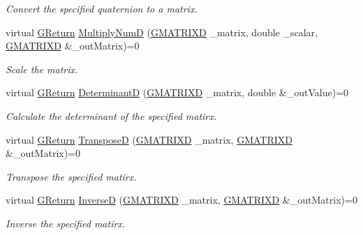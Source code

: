 \begin{DoxyCompactItemize}
\begin{DoxyCompactList}\small\item\em Convert the specified quaternion to a matrix. \end{DoxyCompactList}\item 
virtual \mbox{\hyperlink{namespace_g_w_a67a839e3df7ea8a5c5686613a7a3de21}{G\+Return}} \mbox{\hyperlink{class_g_w_1_1_m_a_t_h_1_1_g_matrix_a34e78f82e720eba937824cdc06490b9c}{Multiply\+NumD}} (\mbox{\hyperlink{struct_g_w_1_1_m_a_t_h_1_1_g_m_a_t_r_i_x_d}{G\+M\+A\+T\+R\+I\+XD}} \+\_\+matrix, double \+\_\+scalar, \mbox{\hyperlink{struct_g_w_1_1_m_a_t_h_1_1_g_m_a_t_r_i_x_d}{G\+M\+A\+T\+R\+I\+XD}} \&\+\_\+out\+Matrix)=0
\begin{DoxyCompactList}\small\item\em Scale the matrix. \end{DoxyCompactList}\item 
virtual \mbox{\hyperlink{namespace_g_w_a67a839e3df7ea8a5c5686613a7a3de21}{G\+Return}} \mbox{\hyperlink{class_g_w_1_1_m_a_t_h_1_1_g_matrix_ab1b528820ac0476f8f3d9202a3036b8c}{DeterminantD}} (\mbox{\hyperlink{struct_g_w_1_1_m_a_t_h_1_1_g_m_a_t_r_i_x_d}{G\+M\+A\+T\+R\+I\+XD}} \+\_\+matrix, double \&\+\_\+out\+Value)=0
\begin{DoxyCompactList}\small\item\em Calculate the determinant of the specified matirx. \end{DoxyCompactList}\item 
virtual \mbox{\hyperlink{namespace_g_w_a67a839e3df7ea8a5c5686613a7a3de21}{G\+Return}} \mbox{\hyperlink{class_g_w_1_1_m_a_t_h_1_1_g_matrix_add9f6f4f4689e683143990b434248404}{TransposeD}} (\mbox{\hyperlink{struct_g_w_1_1_m_a_t_h_1_1_g_m_a_t_r_i_x_d}{G\+M\+A\+T\+R\+I\+XD}} \+\_\+matrix, \mbox{\hyperlink{struct_g_w_1_1_m_a_t_h_1_1_g_m_a_t_r_i_x_d}{G\+M\+A\+T\+R\+I\+XD}} \&\+\_\+out\+Matrix)=0
\begin{DoxyCompactList}\small\item\em Transpose the specified matirx. \end{DoxyCompactList}\item 
virtual \mbox{\hyperlink{namespace_g_w_a67a839e3df7ea8a5c5686613a7a3de21}{G\+Return}} \mbox{\hyperlink{class_g_w_1_1_m_a_t_h_1_1_g_matrix_ade39ff1c70cb06889196893aad819244}{InverseD}} (\mbox{\hyperlink{struct_g_w_1_1_m_a_t_h_1_1_g_m_a_t_r_i_x_d}{G\+M\+A\+T\+R\+I\+XD}} \+\_\+matrix, \mbox{\hyperlink{struct_g_w_1_1_m_a_t_h_1_1_g_m_a_t_r_i_x_d}{G\+M\+A\+T\+R\+I\+XD}} \&\+\_\+out\+Matrix)=0
\begin{DoxyCompactList}\small\item\em Inverse the specified matirx. \end{DoxyCompactList}\item 

\end{DoxyCompactItemize}
